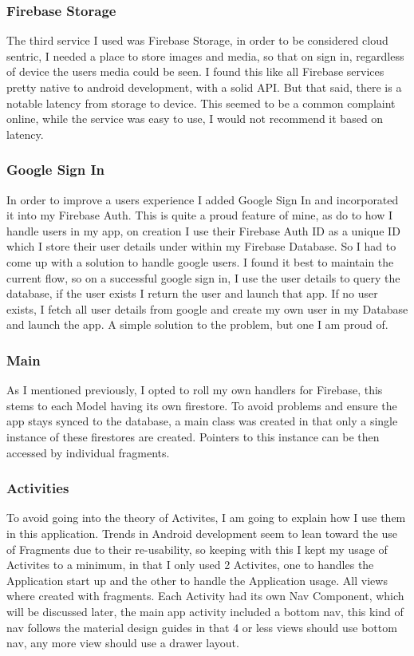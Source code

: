 \subsubsection{ Firebase Storage }
The third service I used was Firebase Storage, in order to be considered cloud sentric, I needed a place to store images and media, so that on sign in, regardless of device the users media could be seen. I found this like all Firebase services pretty native to android development, with a solid API. But that said, there is a notable latency from storage to device. This seemed to be a common complaint online, while the service was easy to use, I would not recommend it based on latency.

\subsubsection{ Google Sign In }
In order to improve a users experience I added Google Sign In and incorporated it into my Firebase Auth. This is quite a proud feature of mine, as do to how I handle users in my app, on creation I use their Firebase Auth ID as a unique ID which I store their user details under within my Firebase Database. So I had to come up with a solution to handle google users. I found it best to maintain the current flow, so on a successful google sign in, I use the user details to query the database, if the user exists I return the user and launch that app. If no user exists, I fetch all user details from google and create my own user in my Database and launch the app. A simple solution to the problem, but one I am proud of.

\subsubsection{ Main }
As I mentioned previously, I opted to roll my own handlers for Firebase, this stems to each Model having its own firestore. To avoid problems and ensure the app stays synced to the database, a main class was created in that only a single instance of these firestores are created. Pointers to this instance can be then accessed by individual fragments.

\subsubsection{ Activities }
To avoid going into the theory of Activites, I am going to explain how I use them in this application. Trends in Android development seem to lean toward the use of Fragments due to their re-usability, so keeping with this I kept my usage of Activites to a minimum, in that I only used 2 Activites, one to handles the Application start up and the other to handle the Application usage. All views where created with fragments. Each Activity had its own Nav Component, which will be discussed later, the main app activity included a bottom nav, this kind of nav follows the material design guides in that 4 or less views should use bottom nav, any more view should use a drawer layout.

